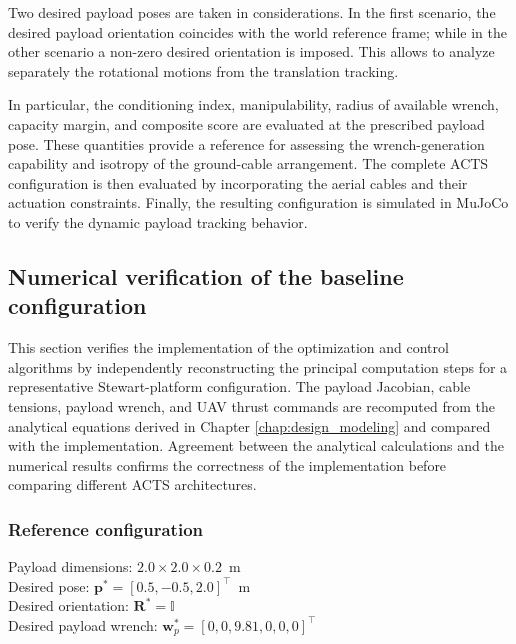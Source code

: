 Two desired payload poses are taken in considerations. In the first scenario, the desired payload orientation coincides with the world reference frame; while in the other scenario a non-zero desired orientation is imposed. This allows to analyze separately the rotational motions from the translation tracking.

In particular, the conditioning index, manipulability, radius of available wrench, capacity margin, and composite score are evaluated at the prescribed payload pose. These quantities provide a reference for assessing the wrench-generation capability and isotropy of the ground-cable arrangement. The complete ACTS configuration is then evaluated by incorporating the aerial cables and their actuation constraints. Finally, the resulting configuration is simulated in MuJoCo to verify the dynamic payload tracking behavior.

\subsection{Numerical verification of the baseline configuration}
This section verifies the implementation of the optimization and control algorithms by independently reconstructing the principal computation steps for a representative Stewart-platform configuration. The payload Jacobian, cable tensions, payload wrench, and UAV thrust commands are recomputed from the analytical equations derived in Chapter \ref{chap:design_modeling} and compared with the implementation. Agreement between the analytical calculations and the numerical results confirms the correctness of the implementation before comparing different ACTS architectures.


\subsubsection{Reference configuration}
Payload dimensions: $2.0 \times 2.0 \times 0.2$~m \\
Desired pose: $\mathbf p^*= [0.5, -0.5, 2.0]^\top$~m \\
Desired orientation: $\mathbf R^* = \mathbb{I}$ \\
Desired payload wrench: $\mathbf{w}_p^* = [0, 0, 9.81, 0, 0, 0]^\top$

